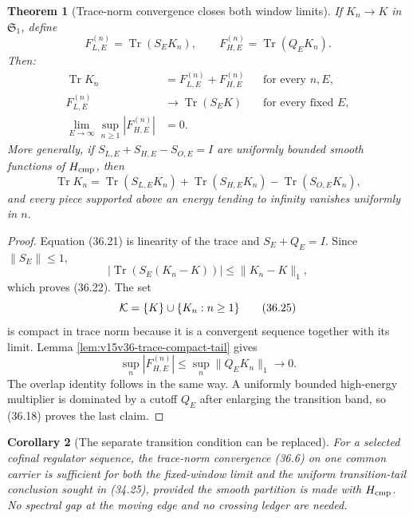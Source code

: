 \documentclass[11pt]{article}
\newtheorem{theorem}{Theorem}[section]
\newtheorem{corollary}[theorem]{Corollary}
\theoremstyle{remark}
\begin{document}
\begin{theorem}[Trace-norm convergence closes both window limits]
\label{thm:v15v36-window-compiler}
If \(K_n\to K\) in \({\mathfrak S}_1\), define
\[
 F_{L,E}^{(n)}=\operatorname{Tr}(S_EK_n),\qquad
 F_{H,E}^{(n)}=\operatorname{Tr}(Q_EK_n).                \tag{36.20}
\]
Then:
\begin{align}
 \operatorname{Tr}K_n
 &=F_{L,E}^{(n)}+F_{H,E}^{(n)}
 &&\text{for every \(n,E\)},                             \tag{36.21}\\
 F_{L,E}^{(n)}
 &\longrightarrow\operatorname{Tr}(S_EK)
 &&\text{for every fixed \(E\)},                         \tag{36.22}\\
 \lim_{E\to\infty}\sup_{n\geq1}|F_{H,E}^{(n)}|
 &=0.                                                     \tag{36.23}
\end{align}
More generally, if
\(S_{L,E}+S_{H,E}-S_{O,E}=I\) are uniformly bounded smooth
functions of \(H_{\rm cmp}\), then
\[
 \operatorname{Tr}K_n
 =\operatorname{Tr}(S_{L,E}K_n)
 +\operatorname{Tr}(S_{H,E}K_n)
 -\operatorname{Tr}(S_{O,E}K_n),                         \tag{36.24}
\]
and every piece supported above an energy tending to infinity
vanishes uniformly in \(n\).
\end{theorem}

\begin{proof}
Equation (36.21) is linearity of the trace and
\(S_E+Q_E=I\).  Since \(\|S_E\|\leq1\),
\[
 |\operatorname{Tr}(S_E(K_n-K))|
 \leq\|K_n-K\|_1,
\]
which proves (36.22).  The set
\[
 {\cal K}=\{K\}\cup\{K_n:n\geq1\}                        \tag{36.25}
\]
is compact in trace norm because it is a convergent sequence
together with its limit.  Lemma
\ref{lem:v15v36-trace-compact-tail} gives
\[
 \sup_n|F_{H,E}^{(n)}|
 \leq\sup_n\|Q_EK_n\|_1\longrightarrow0.
\]
The overlap identity follows in the same way.  A uniformly bounded
high-energy multiplier is dominated by a cutoff \(Q_E\) after
enlarging the transition band, so (36.18) proves the last claim.
\end{proof}

\begin{corollary}[The separate transition condition can be replaced]
\label{cor:v15v36-replaces-transition}
For a selected cofinal regulator sequence, the trace-norm
convergence (36.6) on one common carrier is sufficient for both the
fixed-window limit and the uniform transition-tail conclusion sought
in (34.25), provided the smooth partition is made with
\(H_{\rm cmp}\).  No spectral gap at the moving edge and no crossing
ledger are needed.
\end{corollary}
\end{document}
